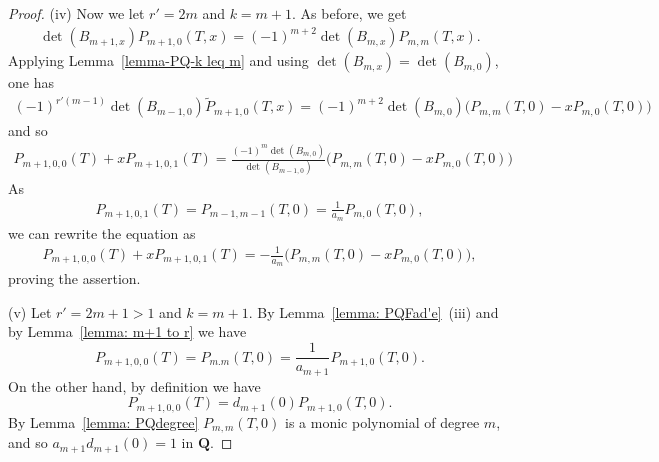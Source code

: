 \documentclass[11pt]{amsart}
\theoremstyle{definition}
\numberwithin{equation}{subsection}
\theoremstyle{plain}
\theoremstyle{plain}
\theoremstyle{plain}
\theoremstyle{plain}
\theoremstyle{plain}
\theoremstyle{plain}
\theoremstyle{plain}
\theoremstyle{plain}
\theoremstyle{plain}
\theoremstyle{plain}
\theoremstyle{plain}
\theoremstyle{plain}
\theoremstyle{definition}
\theoremstyle{definition}
\theoremstyle{definition}
\theoremstyle{remark}
\renewcommand{\(}{\textup{(}}
\renewcommand{\)}{\textup{)}}
\newcommand{\Q}{\mathbf{Q}}
\begin{document}
\begin{proof}
(iv) Now we let $r'=2m$ and $k=m+1$. As before, we get
    \begin{align*}
        \det(B_{m+1,x})P_{m+1,0}(T,x)=(-1)^{m+2}\det(B_{m,x})P_{m,m}(T,x).
    \end{align*}
Applying Lemma~\ref{lemma-PQ-k leq m} and using $\det(B_{m,x})=\det(B_{m,0})$, one has
    \begin{align*}
        (-1)^{r'(m-1)}\det(B_{m-1,0})\tilde P_{m+1,0}(T,x)
        =(-1)^{m+2}\det(B_{m,0})\big(P_{m,m}(T,0)-xP_{m,0}(T,0)\big)
    \end{align*}
    and so
    \begin{align*}
        P_{m+1,0,0}(T)+xP_{m+1,0,1}(T)
        =\frac{(-1)^m\det(B_{m,0})}{\det(B_{m-1,0})}
        \big(P_{m,m}(T,0)-xP_{m,0}(T,0)\big)
    \end{align*}
As
    \begin{align*}
        P_{m+1,0,1}(T)
        =P_{m-1,m-1}(T,0)
        =\frac{1}{a_m}P_{m,0}(T,0),
    \end{align*}
we can rewrite the equation as
    \begin{align*}
        P_{m+1,0,0}(T)+xP_{m+1,0,1}(T)
        =-\frac{1}{a_m}\big(P_{m,m}(T,0)-xP_{m,0}(T,0)\big),
    \end{align*}
proving the assertion.

(v) Let $r'=2m+1 >1$ and $k=m+1$. By Lemma~\ref{lemma: PQFad'e}~(iii) and by Lemma~\ref{lemma: m+1 to r} we have $$P_{m+1,0,0}(T)=P_{m.m}(T,0)=\frac{1}{a_{m+1}}P_{m+1,0}(T,0).$$
On the other hand, by definition we have $$P_{m+1,0,0}(T)=d_{m+1}(0)P_{m+1,0}(T,0).$$
By Lemma~\ref{lemma: PQdegree} $P_{m,m}(T,0)$ is a monic polynomial of degree $m$, and so $a_{m+1}d_{m+1}(0)=1$ in $\Q$.


\end{proof}
\end{document}

